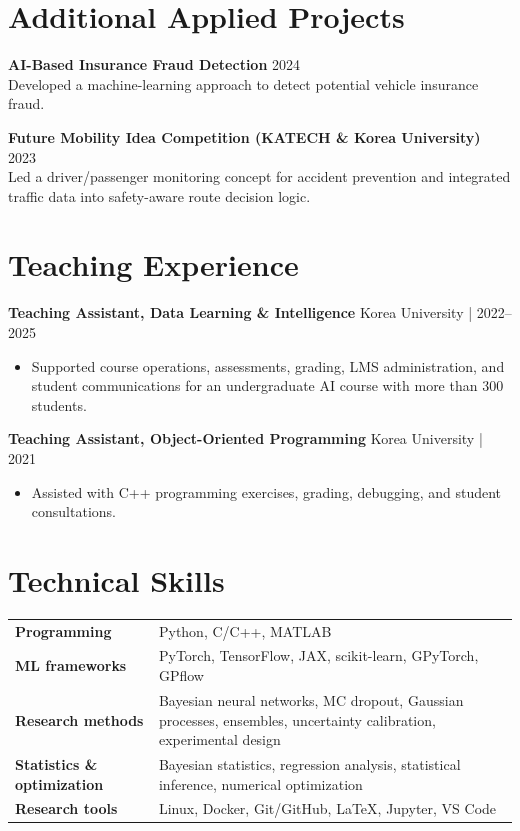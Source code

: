 \documentclass[a4paper,10pt]{article}
\newcommand{\tightgap}{\vspace{5pt}}
\begin{document}
\section{Additional Applied Projects}

\textbf{AI-Based Insurance Fraud Detection} \hfill {\small 2024}\\[-1pt]
\small Developed a machine-learning approach to detect potential vehicle insurance fraud.\normalsize\par

\tightgap
\textbf{Future Mobility Idea Competition (KATECH \& Korea University)} \hfill {\small 2023}\\[-1pt]
\small Led a driver/passenger monitoring concept for accident prevention and integrated traffic data
into safety-aware route decision logic.\normalsize\par

\section{Teaching Experience}

\textbf{Teaching Assistant, Data Learning \& Intelligence} \hfill {\small Korea University | 2022--2025}

\begin{itemize}
\item Supported course operations, assessments, grading, LMS administration, and student
  communications for an undergraduate AI course with more than 300 students.
\end{itemize}

\textbf{Teaching Assistant, Object-Oriented Programming} \hfill {\small Korea University | 2021}

\begin{itemize}
\item Assisted with C++ programming exercises, grading, debugging, and student consultations.
\end{itemize}

\section{Technical Skills}

\begin{tabularx}{\textwidth}{@{}>{\bfseries}p{4.55cm}X@{}}
Programming & Python, C/C++, MATLAB \\[2pt]
ML frameworks & PyTorch, TensorFlow, JAX, scikit-learn, GPyTorch, GPflow \\[2pt]
Research methods & Bayesian neural networks, MC dropout, Gaussian processes, ensembles,
uncertainty calibration, experimental design \\[2pt]
Statistics \& optimization & Bayesian statistics, regression analysis, statistical inference,
numerical optimization \\[2pt]
Research tools & Linux, Docker, Git/GitHub, LaTeX, Jupyter, VS Code
\end{tabularx}
\end{document}
